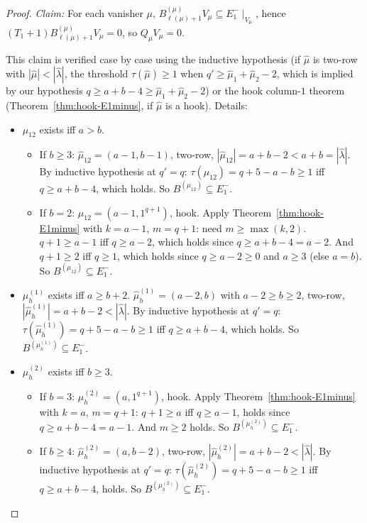 \documentclass[11pt]{article}
\theoremstyle{definition}
\newcommand{\hatl}{\widehat\lambda}
\newcommand{\hatm}{\widehat\mu}
\begin{document}
\begin{proof}
\smallskip\emph{Claim:} For each vanisher $\mu$,
$B^{(\mu)}_{\ell(\mu)+1} V_\mu \subseteq E_1^-\!\mid_{V_\mu}$, hence
$(T_1+1) B^{(\mu)}_{\ell(\mu)+1} V_\mu = 0$, so $Q_\mu V_\mu = 0$.

\smallskip This claim is verified case by case using the inductive
hypothesis (if $\hatm$ is two-row with $|\hatm| < |\hatl|$, the
threshold $\tau(\hatm) \ge 1$ when $q' \ge \hatm_1 + \hatm_2 - 2$,
which is implied by our hypothesis $q \ge a + b - 4 \ge \hatm_1 + \hatm_2 - 2$)
or the hook column-$1$ theorem (Theorem~\ref{thm:hook-E1minus}, if
$\hatm$ is a hook).  Details:

\begin{itemize}[topsep=0.2em,itemsep=0.1em]
\item $\mu_{12}$ exists iff $a > b$.
   \begin{itemize}
   \item If $b \ge 3$: $\hatm_{12} = (a-1, b-1)$, two-row,
      $|\hatm_{12}| = a + b - 2 < a + b = |\hatl|$.  By inductive
      hypothesis at $q' = q$: $\tau(\hatm_{12}) = q + 5 - a - b \ge 1$
      iff $q \ge a + b - 4$, which holds.  So $B^{(\mu_{12})} \subseteq
      E_1^-$.
   \item If $b = 2$: $\mu_{12} = (a-1, 1^{q+1})$, hook.  Apply
      Theorem~\ref{thm:hook-E1minus} with $k = a - 1$, $m = q + 1$:
      need $m \ge \max(k, 2)$.  $q + 1 \ge a - 1$ iff $q \ge a - 2$,
      which holds since $q \ge a + b - 4 = a - 2$.  And $q + 1 \ge 2$
      iff $q \ge 1$, which holds since $q \ge a - 2 \ge 0$ and $a \ge 3$
      (else $a = b$).  So $B^{(\mu_{12})} \subseteq E_1^-$.
   \end{itemize}
\item $\mu_h^{(1)}$ exists iff $a \ge b + 2$.
   $\hatm_h^{(1)} = (a-2, b)$ with $a - 2 \ge b \ge 2$, two-row,
   $|\hatm_h^{(1)}| = a + b - 2 < |\hatl|$.  By inductive hypothesis at
   $q' = q$: $\tau(\hatm_h^{(1)}) = q + 5 - a - b \ge 1$ iff
   $q \ge a + b - 4$, which holds.  So $B^{(\mu_h^{(1)})} \subseteq E_1^-$.
\item $\mu_h^{(2)}$ exists iff $b \ge 3$.
   \begin{itemize}
   \item If $b = 3$: $\mu_h^{(2)} = (a, 1^{q+1})$, hook.  Apply
      Theorem~\ref{thm:hook-E1minus} with $k = a$, $m = q + 1$:
      $q + 1 \ge a$ iff $q \ge a - 1$, holds since $q \ge a + b - 4
      = a - 1$.  And $m \ge 2$ holds.
      So $B^{(\mu_h^{(2)})} \subseteq E_1^-$.
   \item If $b \ge 4$: $\hatm_h^{(2)} = (a, b-2)$, two-row,
      $|\hatm_h^{(2)}| = a + b - 2 < |\hatl|$.  By inductive
      hypothesis at $q' = q$: $\tau(\hatm_h^{(2)}) = q + 5 - a - b \ge 1$
      iff $q \ge a + b - 4$, holds.  So $B^{(\mu_h^{(2)})} \subseteq E_1^-$.
   \end{itemize}
\end{itemize}


\end{proof}
\end{document}
